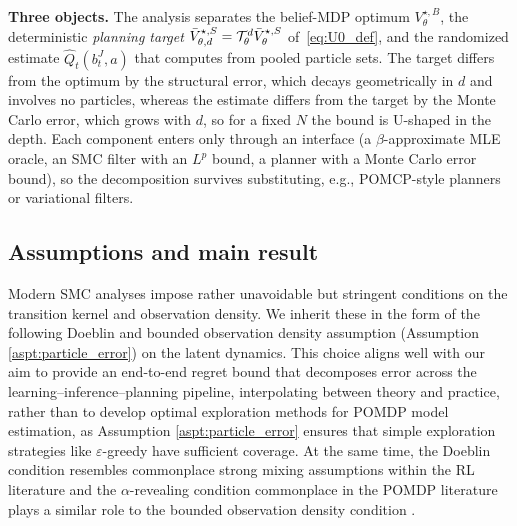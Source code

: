 \textbf{Three objects.} The analysis separates the belief-MDP optimum $V_\theta^{\star,B}$, the deterministic \emph{planning target} $\bar V_{\theta,d}^{\star,S}={\mathcal{T}}_\theta^d\bar V_\theta^{\star,S}$ of~\eqref{eq:U0_def}, and the randomized estimate $\widehat Q_t(b_t^J,a)$ that  computes from pooled particle sets.
The target differs from the optimum by the structural error, which decays geometrically in $d$ and involves no particles, whereas the estimate differs from the target by the Monte Carlo error, which grows with $d$, so for a fixed $N$ the bound is U-shaped in the depth.
Each component enters only through an interface (a $\beta$-approximate MLE oracle, an SMC filter with an $L^p$ bound, a planner with a Monte Carlo error bound), so the decomposition survives substituting, e.g., POMCP-style planners or variational filters.





\subsection{Assumptions and main result}
\label{sec:final_regret}

Modern SMC analyses \citep{delMoral04, chopin20, karjalainen23} impose rather unavoidable but stringent conditions on the transition kernel and observation density. We inherit these in the form of the following Doeblin and bounded observation density assumption (Assumption \ref{aspt:particle_error}) on the latent dynamics. This choice aligns well with our aim to provide an end-to-end regret bound that decomposes error across the learning--inference--planning pipeline, interpolating between theory and practice, rather than to develop optimal exploration methods for POMDP model estimation, as Assumption \ref{aspt:particle_error} ensures that simple exploration strategies like $\varepsilon$-greedy have sufficient coverage. At the same time, the Doeblin condition resembles commonplace strong mixing assumptions within the RL literature \citep{gaur2024closing, wu2022finitetimeanalysistimescale, xu2020improving, kausik2023learning} and the $\alpha$-revealing condition commonplace in the POMDP literature plays a similar role to the bounded observation density condition \citep{liu2022partially,liu2023optimistic}.

